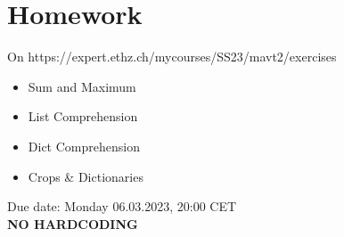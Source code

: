 \documentclass[12pt,c, german, aspectratio=169]{beamer} %
\begin{document}
\section{Homework}
\sectionframe{}

\begin{frame}[fragile]{}

On https://expert.ethz.ch/mycourses/SS23/mavt2/exercises
\begin{itemize}
    \item Sum and Maximum
    \item List Comprehension
    \item Dict Comprehension
    \item Crops \& Dictionaries
\end{itemize}
Due date: Monday 06.03.2023, 20:00 CET\\
\textbf{NO HARDCODING}

\end{frame}


{
\begin{frame}
	\begin{center}
	\Huge{}
	\end{center}
\end{frame}
}
\end{document}
